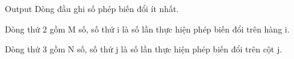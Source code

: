Output
Dòng đầu ghi số phép biến đổi ít nhất.

Dòng thứ 2 gồm M số, số thứ i là số lần thực hiện phép biến đổi trên hàng i.

Dòng thứ 3 gồm N số, số thứ j là số lần thực hiện phép biến đổi trên cột j.
